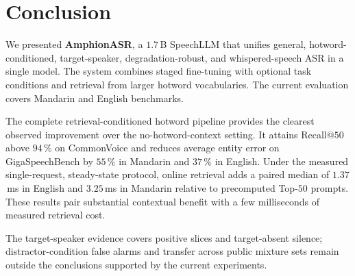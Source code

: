 \section{Conclusion}
\label{sec:conclusion}

We presented \textbf{AmphionASR}, a $1.7$\,B SpeechLLM that unifies
general, hotword-conditioned, target-speaker, degradation-robust, and
whispered-speech ASR in a single model.
The system combines staged fine-tuning with optional task conditions
and retrieval from larger hotword vocabularies.
The current evaluation covers Mandarin and English benchmarks.

The complete retrieval-conditioned hotword pipeline provides the clearest
observed improvement over the no-hotword-context setting. It attains
Recall@$50$ above $94$\,\% on CommonVoice and reduces average entity
error on GigaSpeechBench by $55$\,\% in Mandarin and $37$\,\% in English.
Under the measured single-request, steady-state protocol, online retrieval
adds a paired median of $1.37$\,ms in English and $3.25$\,ms in Mandarin
relative to precomputed Top-$50$ prompts. These results pair substantial contextual
benefit with a few milliseconds of measured retrieval cost.

The target-speaker evidence covers positive slices and target-absent
silence; distractor-condition false alarms and transfer across public
mixture sets remain outside the conclusions supported by the current
experiments.
